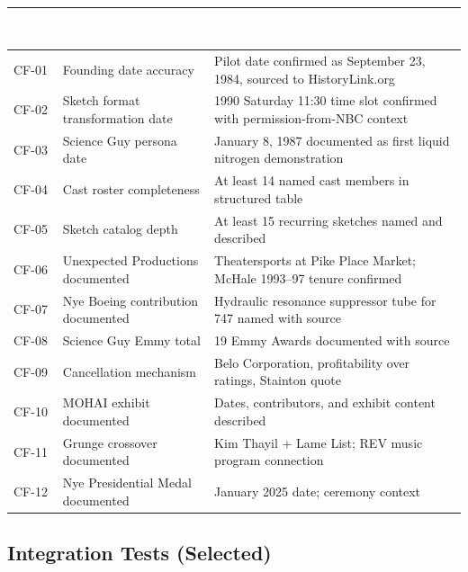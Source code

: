 \documentclass[11pt,letterpaper]{article}
\newcommand{\tableheader}[1]{\textbf{\sffamily\textcolor{white}{#1}}}
\begin{document}
\begin{center}
\begin{tabularx}{\textwidth}{C{1.5cm}L{4.5cm}X}
\toprule
{}
\tableheader{Test ID} & \tableheader{Verifies} & \tableheader{Expected} \\
\midrule
CF-01 & Founding date accuracy & Pilot date confirmed as September 23, 1984, sourced to HistoryLink.org \\
CF-02 & Sketch format transformation date & 1990 Saturday 11:30 time slot confirmed with permission-from-NBC context \\
CF-03 & Science Guy persona date & January 8, 1987 documented as first liquid nitrogen demonstration \\
CF-04 & Cast roster completeness & At least 14 named cast members in structured table \\
CF-05 & Sketch catalog depth & At least 15 recurring sketches named and described \\
CF-06 & Unexpected Productions documented & Theatersports at Pike Place Market; McHale 1993--97 tenure confirmed \\
CF-07 & Nye Boeing contribution documented & Hydraulic resonance suppressor tube for 747 named with source \\
CF-08 & Science Guy Emmy total & 19 Emmy Awards documented with source \\
CF-09 & Cancellation mechanism & Belo Corporation, profitability over ratings, Stainton quote \\
CF-10 & MOHAI exhibit documented & Dates, contributors, and exhibit content described \\
CF-11 & Grunge crossover documented & Kim Thayil + Lame List; REV music program connection \\
CF-12 & Nye Presidential Medal documented & January 2025 date; ceremony context \\
\bottomrule
\end{tabularx}
\end{center}

\subsection{Integration Tests (Selected)}
\end{document}
